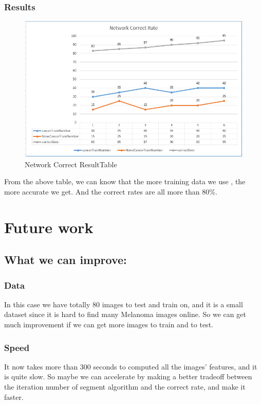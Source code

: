 \documentclass[14pt]{report} %
\begin{document}
	\subsection{Results}
	\begin{figure}[H]
		\includegraphics[width=\textwidth]{image/resultTable.jpg} 
		\caption{Network Correct ResultTable} 
		 \label{fig:resultTable} 		 
	\end{figure}
	From the above table, we can know that the more training data we use , the more accurate we get. And the correct rates are all more than 80\%.
\chapter{Future work}
\clearpage
\section{What we can improve:}
\subsection{Data}
	In this case we have totally 80 images to test and train on, and it is a small dataset since it is hard to find many Melanoma images online. So we can get much  improvement if we can get more images to train and to test.
\subsection{Speed}
	It now takes more than 300 seconds to computed all the images' features, and it is quite slow. So maybe we can accelerate by making a better tradeoff between the iteration number of segment algorithm and the correct rate, and make it faster.
\end{document}

